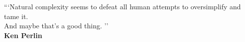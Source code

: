 
\pretextualchapter{}
\vspace{8cm}
\begin{flushright}
\textnormal{```Natural complexity seems to defeat all human attempts to oversimplify and tame it. \\
	 And maybe that's a good thing. '' \\
	\bfseries Ken Perlin}
\end{flushright}

